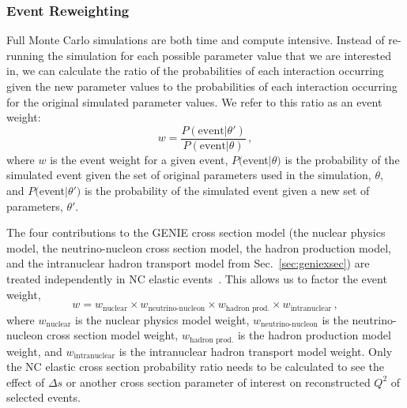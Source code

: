   \subsubsection{Event Reweighting}\label{sec:reweighting}
    Full Monte Carlo simulations are both time and compute intensive. Instead
    of re-running the simulation for each possible parameter value that we are
    interested in, we can calculate the ratio of the probabilities of each
    interaction occurring given the new parameter values to the probabilities
    of each interaction occurring for the original simulated parameter values.
    We refer to this ratio as an event weight:
    \begin{equation}
      w = \frac{P(\textrm{event}|\theta')}{P(\textrm{event}|\theta)} \,,
    \end{equation}
    where $w$ is the event weight for a given event, $P($event$|\theta)$ is the
    probability of the simulated event given the set of original parameters
    used in the simulation, $\theta$, and $P($event$|\theta')$ is the
    probability of the simulated event given a new set of parameters,
    $\theta'$.

    The four contributions to the GENIE cross section model (the nuclear
    physics model, the neutrino-nucleon cross section model, the hadron
    production model, and the intranuclear hadron transport model from
    Sec.~\ref{sec:geniexsec}) are treated independently in NC elastic
    events~\cite{Andreopoulos:2009rq}. This allows us to factor the event
    weight,
    \begin{equation}\label{eq:weights}
      w = w_{\textrm{nuclear}}\times w_{\textrm{neutrino-nucleon}}\times 
          w_{\textrm{hadron prod.}}\times w_{\textrm{intranuclear}} \,,
    \end{equation}
    where $w_{\textrm{nuclear}}$ is the nuclear physics model weight,
    $w_{\textrm{neutrino-nucleon}}$ is the neutrino-nucleon cross section model
    weight, $w_{\textrm{hadron prod.}}$ is the hadron production model weight,
    and $w_{\textrm{intranuclear}}$ is the intranuclear hadron transport model
    weight. Only the NC elastic cross section probability ratio needs to be
    calculated to see the effect of $\Delta s$ or another cross section
    parameter of interest on reconstructed $Q^2$ of selected events.

